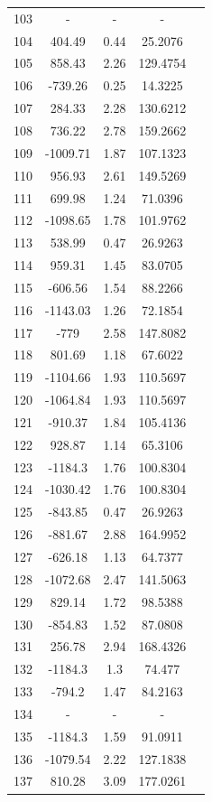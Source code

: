 {\begin{longtable}{ccccc}
103 & - & - & -   \\ 
104 & 404.49 & 0.44 & 25.2076 \\ 
105 & 858.43 & 2.26 & 129.4754 \\ 
106 & -739.26 & 0.25 & 14.3225 \\ 
107 & 284.33 & 2.28 & 130.6212 \\ 
108 & 736.22 & 2.78 & 159.2662 \\ 
109 & -1009.71 & 1.87 & 107.1323 \\ 
110 & 956.93 & 2.61 & 149.5269 \\ 
111 & 699.98 & 1.24 & 71.0396 \\ 
112 & -1098.65 & 1.78 & 101.9762 \\ 
113 & 538.99 & 0.47 & 26.9263 \\ 
114 & 959.31 & 1.45 & 83.0705 \\ 
115 & -606.56 & 1.54 & 88.2266 \\ 
116 & -1143.03 & 1.26 & 72.1854 \\ 
117 & -779 & 2.58 & 147.8082 \\ 
118 & 801.69 & 1.18 & 67.6022 \\ 
119 & -1104.66 & 1.93 & 110.5697 \\ 
120 & -1064.84 & 1.93 & 110.5697 \\ 
121 & -910.37 & 1.84 & 105.4136 \\ 
122 & 928.87 & 1.14 & 65.3106 \\ 
123 & -1184.3 & 1.76 & 100.8304 \\ 
124 & -1030.42 & 1.76 & 100.8304 \\ 
125 & -843.85 & 0.47 & 26.9263 \\ 
126 & -881.67 & 2.88 & 164.9952 \\ 
127 & -626.18 & 1.13 & 64.7377 \\ 
128 & -1072.68 & 2.47 & 141.5063 \\ 
129 & 829.14 & 1.72 & 98.5388 \\ 
130 & -854.83 & 1.52 & 87.0808 \\ 
131 & 256.78 & 2.94 & 168.4326 \\ 
132 & -1184.3 & 1.3 & 74.477 \\ 
133 & -794.2 & 1.47 & 84.2163 \\ 
134 & - & - & -   \\ 
135 & -1184.3 & 1.59 & 91.0911 \\ 
136 & -1079.54 & 2.22 & 127.1838 \\ 
137 & 810.28 & 3.09 & 177.0261 \\ 

\end{longtable}}
